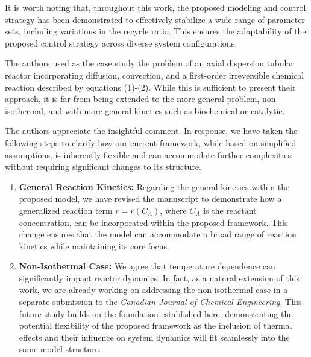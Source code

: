 \documentclass[11pt,answers]{exam}
\begin{document}
\begin{questions}
\begin{solutionorbox}
        It is worth noting that, throughout this work, the proposed modeling and control strategy has been demonstrated to effectively stabilize a wide range of parameter sets, including variations in the recycle ratio. This ensures the adaptability of the proposed control strategy across diverse system configurations.
    \end{solutionorbox}

    
    \question The authors used as the case study the problem of an axial dispersion tubular reactor incorporating diffusion, convection, and a first-order irreversible chemical reaction described by equations (1)-(2). While this is sufficient to present their approach, it is far from being extended to the more general problem, non-isothermal, and with more general kinetics such as biochemical or catalytic.

    \begin{solutionorbox} \label{comment:2_3}
        The authors appreciate the insightful comment. In response, we have taken the following steps to clarify how our current framework, while based on simplified assumptions, is inherently flexible and can accommodate further complexities without requiring significant changes to its structure. 

        \begin{enumerate}
            \item \textbf{General Reaction Kinetics:} Regarding the general kinetics within the proposed model, we have revised the manuscript to demonstrate how a generalized reaction term \( r = r(C_A) \), where \( C_A \) is the reactant concentration, can be incorporated within the proposed framework. This change ensures that the model can accommodate a broad range of reaction kinetics while maintaining its core focus.
            
            \item \textbf{Non-Isothermal Case:} We agree that temperature dependence can significantly impact reactor dynamics. In fact, as a natural extension of this work, we are already working on addressing the non-isothermal case in a separate submission to the \textit{Canadian Journal of Chemical Engineering}. This future study builds on the foundation established here, demonstrating the potential flexibility of the proposed framework as the inclusion of thermal effects and their influence on system dynamics will fit seamlessly into the same model structure.
        \end{enumerate}


\end{solutionorbox}
\end{questions}
\end{document}
